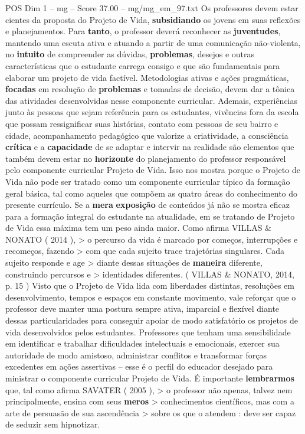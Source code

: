 \begin{textsample}{POS Dim 1 – mg – Score 37.00 – mg/mg\_em\_97.txt}
Os professores devem estar cientes da proposta do Projeto de Vida, \textbf{subsidiando} os jovens em suas reflexões e planejamentos.
Para \textbf{tanto}, o professor deverá reconhecer as \textbf{juventudes}, mantendo uma escuta ativa e atuando a partir de uma comunicação não-violenta, no \textbf{intuito} de compreender as dúvidas, \textbf{problemas}, desejos e outras características que o estudante carrega consigo e que são fundamentais para elaborar um projeto de vida factível.
Metodologias ativas e ações pragmáticas, \textbf{focadas} em resolução de \textbf{problemas} e tomadas de decisão, devem dar a tônica das atividades desenvolvidas nesse componente curricular.
Ademais, experiências junto às pessoas que sejam referência para os estudantes, vivências fora da escola que possam ressignificar suas histórias, contato com pessoas de seu bairro e cidade, acompanhamento pedagógico que valorize a criatividade, a consciência \textbf{crítica} e a \textbf{capacidade} de se adaptar e intervir na realidade são elementos que também devem estar no \textbf{horizonte} do planejamento do professor responsável pelo componente curricular Projeto de Vida.
Isso nos mostra porque o Projeto de Vida não pode ser tratado como um componente curricular típico da formação geral básica, tal como aqueles que compõem as quatro áreas do conhecimento do presente currículo.
Se a \textbf{mera} \textbf{exposição} de conteúdos já não se mostra eficaz para a formação integral do estudante na atualidade, em se tratando de Projeto de Vida essa máxima tem um peso ainda maior.
Como afirma VILLAS \& NONATO ( 2014 ), > o percurso da vida é marcado por começos, interrupções e recomeços, fazendo > com que cada sujeito trace trajetórias singulares.
Cada sujeito responde e age > diante dessas situações de \textbf{maneira} diferente, construindo percursos e > identidades diferentes. ( VILLAS \& NONATO, 2014, p. 15 ) Visto que o Projeto de Vida lida com liberdades distintas, resoluções em desenvolvimento, tempos e espaços em constante movimento, vale reforçar que o professor deve manter uma postura sempre ativa, imparcial e flexível diante dessas particularidades para conseguir apoiar de modo satisfatório os projetos de vida desenvolvidos pelos estudantes.
Professores que tenham uma sensibilidade em identificar e trabalhar dificuldades intelectuais e emocionais, exercer sua autoridade de modo amistoso, administrar conflitos e transformar forças excedentes em ações assertivas – esse é o perfil do educador desejado para ministrar o componente curricular Projeto de Vida.
É importante \textbf{lembrarmos} que, tal como afirma SAVATER ( 2005 ), > o professor não apenas, talvez nem principalmente, ensina com seus \textbf{meros} > conhecimentos científicos, mas com a arte de persuasão de sua ascendência > sobre os que o atendem : deve ser capaz de seduzir sem hipnotizar.

\end{textsample}
